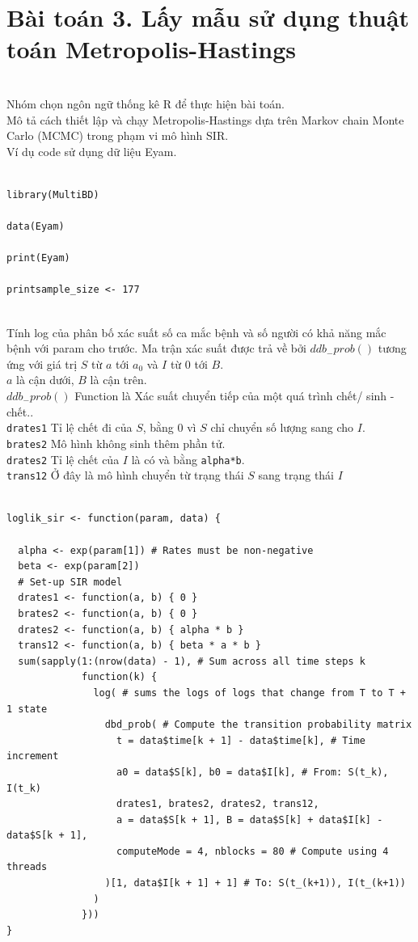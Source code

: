 \documentclass[a4paper]{article}
\begin{document}
\section{Bài toán 3. Lấy mẫu sử dụng thuật toán Metropolis-Hastings}
\\
Nhóm chọn ngôn ngữ thống kê R để thực hiện bài toán.\\

Mô tả cách thiết lập và chạy Metropolis-Hastings dựa trên Markov chain Monte Carlo (MCMC) trong phạm vi mô hình SIR.\\
Ví dụ code sử dụng dữ liệu Eyam.\\
\begin{lstlisting}

library(MultiBD)

data(Eyam)

print(Eyam)

printsample_size <- 177
\end{lstlisting}
\\
Tính log của phân bố xác suất số ca mắc bệnh và số người có khả năng mắc bệnh với param cho trước. Ma trận xác suất được trả về bởi $ ddb_{-}prob() $ tương ứng với giá trị $S$ từ $a$ tới $a_{0}$  và $I$ từ $0$ tới $B$.\\
$a$ là cận dưới, $B$ là cận trên.
\\
$ ddb_{-}prob() $ Function là Xác suất chuyển tiếp của một quá trình chết/ sinh - chết..\\
\lstinline{drates1} Tỉ lệ chết đi của $S$, bằng 0 vì $S$ chỉ chuyển số lượng sang cho $I$.\\
\lstinline{brates2} Mô hình không sinh thêm phần tử.\\
\lstinline{drates2} Tỉ lệ chết của $I$ là có và bằng \lstinline{alpha*b}.\\
\lstinline{trans12} Ở đây là mô hình chuyển từ trạng thái $S$ sang trạng thái $I$
\\
\begin{lstlisting}

loglik_sir <- function(param, data) {
                                            
  alpha <- exp(param[1]) # Rates must be non-negative
  beta <- exp(param[2])
  # Set-up SIR model
  drates1 <- function(a, b) { 0 }                    
  brates2 <- function(a, b) { 0 }                     
  drates2 <- function(a, b) { alpha * b }            
  trans12 <- function(a, b) { beta * a * b }          
  sum(sapply(1:(nrow(data) - 1), # Sum across all time steps k
             function(k) {
               log( # sums the logs of logs that change from T to T + 1 state
                 dbd_prob( # Compute the transition probability matrix
                   t = data$time[k + 1] - data$time[k], # Time increment
                   a0 = data$S[k], b0 = data$I[k], # From: S(t_k), I(t_k)
                   drates1, brates2, drates2, trans12,
                   a = data$S[k + 1], B = data$S[k] + data$I[k] - data$S[k + 1],
                   computeMode = 4, nblocks = 80 # Compute using 4 threads
                 )[1, data$I[k + 1] + 1] # To: S(t_(k+1)), I(t_(k+1))
               )
             }))
}
\end{lstlisting}
\end{document}
